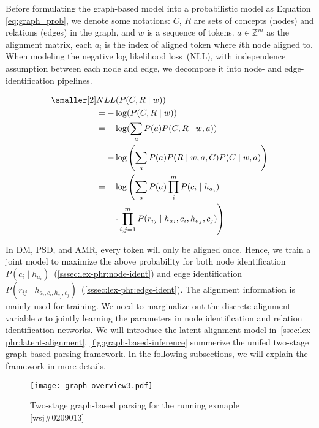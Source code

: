 Before formulating the graph-based model into a probabilistic model as
Equation \ref{eq:graph_prob}, we denote some notations: $C$, $R$ are
sets of concepts (nodes) and relations (edges) in the graph, and $w$
is a sequence of tokens.  $a \in {\mathbb{Z}}^m$ as the alignment
matrix, each $a_{i}$ is the index of aligned token where $i$th node
aligned to. When modeling the negative log likelihood loss~(NLL), with
independence assumption between each node and edge, we decompose it
into node- and edge-identification pipelines.

\begin{equation}
  \label{eq:graph_prob}
\begin{aligned} \smaller[2]
 & NLL(P(C,R \mid w)) \\
 & = - \log(P(C,R \mid w)) \\
 & = - \log(\sum_{a}{P(a) P(C,R \mid w,a)}) \\
 & = - \log\left(\sum_{a}P(a) P(R\mid w,a,C) P(C \mid w, a)\right) \\
 & = - \log\left(\sum_{a}P(a) \prod_{i}^{m} P(c_{i} \mid h_{a_{i}}) \right. \\
 & \qquad \left.\cdot \prod_{i,j=1}^{m}P(r_{ij} \mid h_{a_{i}}, c_{i}, h_{a_{j}}, c_{j})\right)
\end{aligned}
\end{equation}

In DM, PSD, and AMR, every token will only be aligned once.  Hence, we
train a joint model to maximize the above probability for both node
identification
$P(c_{i} \mid h_{a_{i}})$~(\autoref{sssec:lex-phr:node-ident}) and edge
identification
$P(r_{ij} \mid h_{{a_{i}}, c_{i},h_{a_{j}},
  c_{j}})$~(\autoref{sssec:lex-phr:edge-ident}). The alignment
information is mainly used for training. We need to marginalize out
the discrete alignment variable $a$ to jointly learning the parameters
in node identification and relation identification networks. We will
introduce the latent alignment model
in~\autoref{ssec:lex-phr:latent-alignment}. \autoref{fig:graph-based-inference}
summerize the unifed two-stage graph based parsing framework. In the
following subsections, we will explain the framework in more details.

\begin{figure}[h] \centering
  \texttt{[image: graph-overview3.pdf]}
  \caption{\label{fig:graph-based-inference} Two-stage graph-based
    parsing for the running exmaple [wsj\#0209013]}
\end{figure}

